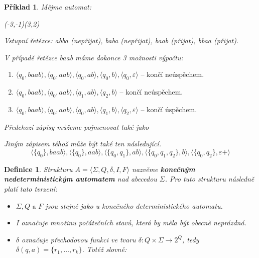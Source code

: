 \documentclass[10pt, a4paper, titlepage]{article}
\theoremstyle{note}
\newtheorem{definice}{Definice}
\newtheorem{priklad}{Příklad}
\begin{document}
\begin{priklad}
Mějme automat:

\vspace*{40px}
\begin{center}
\begin{VCPicture}{(-3,-1)(3,2)}

\end{VCPicture}
\end{center}

Vstupní řetězce: \textit{abba} (nepřijat), \textit{baba} (nepřijat), \textit{baab} (přijat), \textit{bbaa} (přijat).

V případě řetězce \textit{baab} máme dokonce 3 možnosti výpočtu:
\begin{enumerate}
\item
$\langle q_{0}, baab \rangle, \langle q_{0}, aab \rangle, \langle q_{0}, ab \rangle, \langle q_{0}, b \rangle, \langle q_{0}, \varepsilon \rangle \text{ -- končí neúspěchem.}$
\item
$\langle q_{0}, baab \rangle, \langle q_{0}, aab \rangle, \langle q_{1}, ab \rangle, \langle q_{2}, b \rangle \text{ -- končí neúspěchem.}$
\item
$\langle q_{0}, baab \rangle, \langle q_{0}, aab \rangle, \langle q_{0}, ab \rangle, \langle q_{1}, b \rangle, \langle q_{2}, \varepsilon \rangle \text{ -- končí úspěchem.}$ 
\end{enumerate}
Předchozí zápisy můžeme pojmenovat také jako 

Jiným zápisem téhož může být také ten následující.
$$
\langle \lbrace q_{0} \rbrace, baab \rangle, \langle \lbrace q_{0} \rbrace, aab \rangle, \langle \lbrace q_{0}, q_{1} \rbrace, ab \rangle,
\langle \lbrace q_{0}, q_{1}, q_{2} \rbrace, b \rangle, \langle \lbrace q_{0}, q_{2} \rbrace, \varepsilon+ \rangle
$$ 
\end{priklad}

\begin{definice}
Strukturu $A = \langle \Sigma, Q, \delta, I, F \rangle$ nazvěme \textbf{konečným nedeterministickým automatem} nad abecedou $\Sigma$. Pro tuto strukturu následně platí tato tvrzení:
\begin{itemize}
\item
$\Sigma, Q \text{ a } F$ jsou stejné jako u konečného deterministického automatu.
\item
\textit{I} označuje množinu počátečních stavů, která by měla být obecně neprázdná.
\item
$\delta$ označuje přechodovou funkci ve tvaru $\delta : Q \times \Sigma \rightarrow 2^{Q}$, tedy $\delta (q, a) = \lbrace r_{1}, \ldots, r_{k} \rbrace$. Totéž slovně: 
\end{itemize}
\end{definice}
\end{document}
